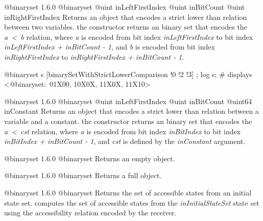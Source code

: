 {@binaryset}
{1.6.0}
{@binaryset}
{@uint inLeftFirstIndex}
{@uint inBitCount}
{@uint inRightFirstIndex}
{Returns an  object that encodes a strict lower than relation between two variables.}
{the constructor returns an binary set that encodes the \emph{a~<~b} relation, where \emph{a} is encoded from bit index \emph{inLeftFirstIndex} to bit index \emph{inLeftFirstIndex  + inBitCount - 1}, and \emph{b} is encoded from bit index \emph{inRightFirstIndex} to \emph{inRightFirstIndex + inBitCount - 1}.}

\exempleDeuxLignes
{}
{@binaryset s [binarySetWithStrictLowerComparison !0 !2 !3] ;}
{log s; \# displays <@binaryset:~01X00, 10X0X, 11X0X, 11X10>}





{@binaryset}
{1.6.0}
{@binaryset}
{@uint inLeftFirstIndex}
{@uint inBitCount}
{@uint64 inConstant}
{Returns an  object that encodes a strict lower than relation between a variable and a constant.}
{the constructor returns an binary set that encodes the \emph{a~<~cst} relation, where \emph {a} is encoded from bit index \emph{inBitIndex} to bit index \emph{inBitIndex  + inBitCount - 1}, and \emph{cst} is defined by the \emph{inConstant} argument.}





{@binaryset}
{1.6.0}
{@binaryset}
{Returns an empty  object.}
{}





{@binaryset}
{1.6.0}
{@binaryset}
{Returns a full  object.}
{}






{@binaryset}
{1.6.0}
{@binaryset}
{Returns the set of accessible states from an initial state set.}
{computes the set of accessible states from the \emph{inInitialStateSet} state set using the accessibility relation encoded by the receiver.}

